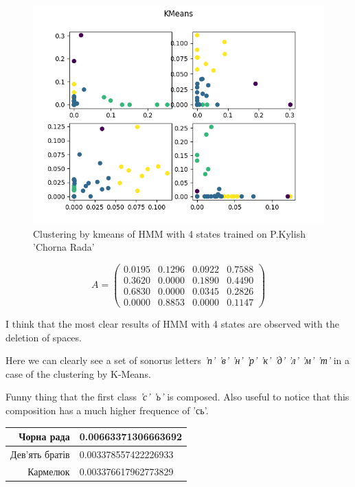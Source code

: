 \documentclass[12pt,a4paper]{article}
\begin{document}
  \begin{figure}[h]
    \includegraphics[width=\textwidth]{../plots/kylish-chorna-rada-without-spaces-clustering-4-kmeans-1671021935.735613.png}
    \centering
    \caption{Clustering by kmeans of HMM with 4 states trained on P.Kylish 'Chorna Rada'}
  \end{figure}
	
  \[ A = \begin{pmatrix}
      0.0195 & 0.1296 & 0.0922 & 0.7588 \\
      0.3620 & 0.0000 & 0.1890 & 0.4490 \\
      0.6830 & 0.0000 & 0.0345 & 0.2826 \\
      0.0000 & 0.8853 & 0.0000 & 0.1147
  \end{pmatrix}  \] 

  I think that the most clear results of HMM with 4 states
  are observed with the deletion of spaces.

  Here we can clearly see a set of sonorus letters
  \textit{'п' 'в' 'н' 'р' 'к' 'д' 'л' 'м' 'т'}
  in a case of the clustering by K-Means.

  Funny thing that the first class
  \textit{'с' 'ь'}
  is composed. Also useful to notice that this composition
  has a much higher frequence of 'сь'.

  \begin{center}
  \begin{tabular}{ | r | l | }
    \hline
    Чорна рада & 0.00663371306663692 \\
    \hline
    Дев'ять братів & 0.003378557422226933 \\
    \hline
    Кармелюк & 0.003376617962773829 \\
    \hline
  \end{tabular}
  \end{center}
\end{document}
